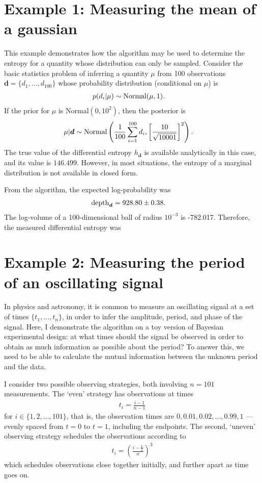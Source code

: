 \documentclass[entropy,article,accept,oneauthor,pdftex,10pt,a4paper]{mdpi}
\renewcommand{\d}{\boldsymbol{d}}
\newcommand{\depth}{\textnormal{depth}}
\begin{document}
\section{Example 1: Measuring the mean of a gaussian}

This example demonstrates how the algorithm may be used to determine the
entropy for a quantity whose distribution can only be sampled.
Consider the basic statistics problem of inferring a quantity $\mu$ from
100 observations $\d = \{d_1, ..., d_{100}\}$ whose
probability distribution (conditional on $\mu$) is
\begin{align}
p(d_i | \mu) &\sim \textnormal{Normal}(\mu, 1).
\end{align}
If the prior for $\mu$ is Normal$(0, 10^2)$, then the posterior is
\begin{align}
\mu | \d &\sim \textnormal{Normal}\left(
                                       \frac{1}{100}\sum_{i=1}^{100} d_i,
                                       \left[\frac{10}{\sqrt{10001}}\right]^2
                                       \right).
\end{align}
The true value of the differential entropy $h_{\d}$ is available analytically
in this case, and its value is $146.499$. However, in most situations, the
entropy of a marginal distribution is not available in closed form. 

From the algorithm, the expected log-probability was
\begin{align}
\depth_{\d} &= 928.80 \pm 0.38.
\end{align}
The log-volume of a 100-dimensional ball of radius $10^{-3}$ is
-782.017. Therefore, the measured differential entropy was



\section{Example 2: Measuring the period of an oscillating signal}

In physics and astronomy, it is common to measure an oscillating signal
at a set of times $\{t_1, ..., t_n\}$, in order to infer the amplitude,
period, and phase of the signal.
Here, I demonstrate the algorithm on a toy version
of Bayesian experimental design: at what times should the signal be
observed in order to obtain as much information as possible about the
period? To answer this, we need to be able to calculate the mutual
information between the unknown period and the data.

I consider two possible observing strategies, both involving
$n=101$ measurements. The `even' strategy has observations at times
\begin{align}
t_i = \frac{i-1}{n-1}
\end{align}
for $i \in \{1, 2, ..., 101\}$, that is, the observation times are
$0, 0.01, 0.02, ..., 0.99, 1$ ---
evenly spaced from $t=0$ to $t=1$, including the endpoints.
The second, `uneven' observing strategy schedules the observations
according to
\begin{align}
t_i = \left(\frac{i - \frac{1}{2}}{n}\right)^3
\end{align}
which schedules observations close together initially, and further apart
as time goes on.
\end{document}
